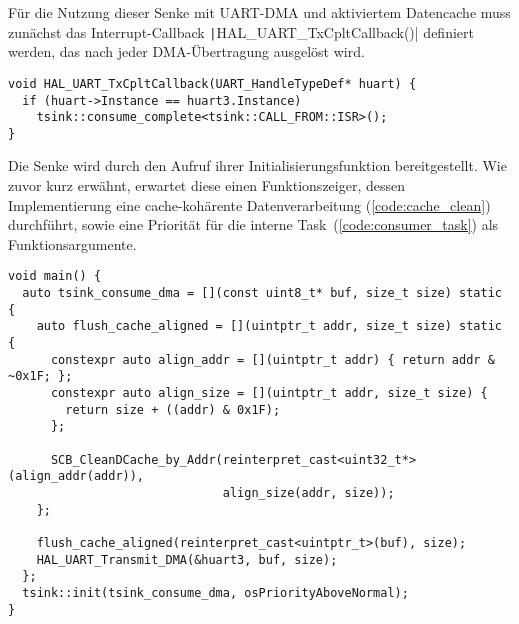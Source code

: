 Für die Nutzung dieser Senke mit UART-DMA und aktiviertem Datencache muss
zunächst das Interrupt-Callback \texttt|HAL_UART_TxCpltCallback()|
definiert werden, das nach jeder DMA-Übertragung ausgelöst wird.

\begin{code}
\begin{verbatim}
void HAL_UART_TxCpltCallback(UART_HandleTypeDef* huart) {
  if (huart->Instance == huart3.Instance)
    tsink::consume_complete<tsink::CALL_FROM::ISR>();
}
\end{verbatim}
\end{code}

Die Senke wird durch den Aufruf ihrer Initialisierungsfunktion bereitgestellt.
Wie zuvor kurz erwähnt, erwartet diese einen Funktionszeiger, dessen
Implementierung eine cache-kohärente Datenverarbeitung (\ref{code:cache_clean})
durchführt, sowie eine Priorität für die interne Task~(\ref{code:consumer_task})
als Funktionsargumente.

\begin{code}
\begin{verbatim}
void main() {
  auto tsink_consume_dma = [](const uint8_t* buf, size_t size) static {
    auto flush_cache_aligned = [](uintptr_t addr, size_t size) static {
      constexpr auto align_addr = [](uintptr_t addr) { return addr & ~0x1F; };
      constexpr auto align_size = [](uintptr_t addr, size_t size) {
        return size + ((addr) & 0x1F);
      };

      SCB_CleanDCache_by_Addr(reinterpret_cast<uint32_t*>(align_addr(addr)),
                              align_size(addr, size));
    };

    flush_cache_aligned(reinterpret_cast<uintptr_t>(buf), size);
    HAL_UART_Transmit_DMA(&huart3, buf, size);
  };
  tsink::init(tsink_consume_dma, osPriorityAboveNormal);
}
\end{verbatim}
    \label{code:sink_initialization}
\end{code}

